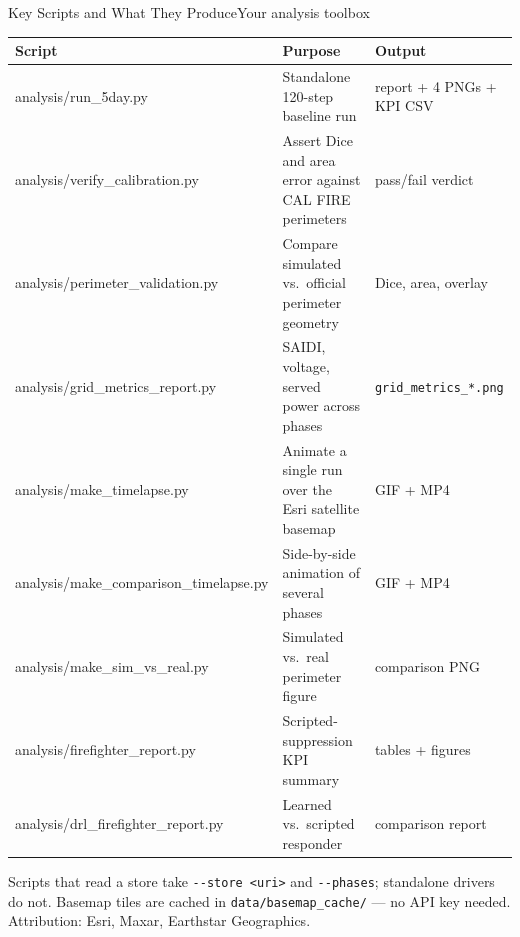 \documentclass[aspectratio=169,9pt]{beamer}
\newcommand{\code}[1]{{\small\texttt{#1}}}
\begin{document}
\begin{frame}{Key Scripts and What They Produce}{Your analysis toolbox}
  \small
  \begin{tabular}{@{}>{\ttfamily\scriptsize}l p{} p{}@{}}
    \toprule
    \textrm{\textbf{Script}} & \textbf{Purpose} & \textbf{Output} \\
    \midrule
    analysis/run\_5day.py            & Standalone 120-step baseline run
      & report + 4 PNGs + KPI CSV \\
    analysis/verify\_calibration.py  & Assert Dice and area error against
      CAL FIRE perimeters & pass/fail verdict \\
    analysis/perimeter\_validation.py & Compare simulated vs.\ official
      perimeter geometry & Dice, area, overlay \\
    analysis/grid\_metrics\_report.py & SAIDI, voltage, served power across
      phases & \code{grid\_metrics\_*.png} \\
    analysis/make\_timelapse.py      & Animate a single run over the Esri
      satellite basemap & GIF + MP4 \\
    analysis/make\_comparison\_timelapse.py & Side-by-side animation of
      several phases & GIF + MP4 \\
    analysis/make\_sim\_vs\_real.py   & Simulated vs.\ real perimeter figure
      & comparison PNG \\
    analysis/firefighter\_report.py  & Scripted-suppression KPI summary
      & tables + figures \\
    analysis/drl\_firefighter\_report.py & Learned vs.\ scripted responder
      & comparison report \\
    \bottomrule
  \end{tabular}
  \vskip5pt
  {\scriptsize\color{csladarkgray}Scripts that read a store take
   \texttt{-\/-store <uri>} and \texttt{-\/-phases}; standalone drivers do not.
   Basemap tiles are cached in \texttt{data/basemap\_cache/} --- no API key
   needed. Attribution: Esri, Maxar, Earthstar Geographics.}
\end{frame}
\end{document}
